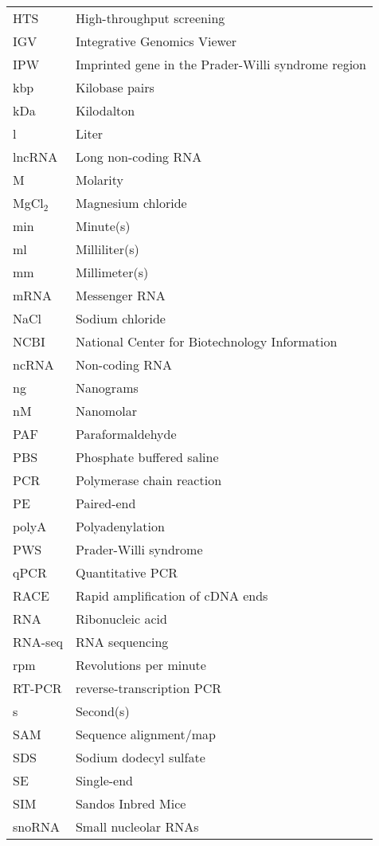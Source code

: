 \begin{longtabu}{ll}
  HTS    & High-throughput screening\\
  IGV    & Integrative Genomics Viewer\\
  IPW    & Imprinted gene in the Prader-Willi syndrome region\\
  kbp    & Kilobase pairs\\
  kDa    & Kilodalton\\
  l      & Liter\\
  lncRNA & Long non-coding RNA\\
  M      & Molarity\\
  MgCl$_2$ & Magnesium chloride\\
  min    & Minute(s)\\
  ml     & Milliliter(s)\\
  mm     & Millimeter(s)\\
  mRNA   & Messenger RNA\\
  NaCl   & Sodium chloride\\
  NCBI   & National Center for Biotechnology Information\\
  ncRNA  & Non-coding RNA\\
  ng     & Nanograms\\
  nM     & Nanomolar\\
  PAF    & Paraformaldehyde\\
  PBS    & Phosphate buffered saline\\
  PCR    & Polymerase chain reaction\\
  PE     & Paired-end\\
  polyA  & Polyadenylation\\
  PWS    & Prader-Willi syndrome\\
  qPCR   & Quantitative PCR\\
  RACE   & Rapid amplification of cDNA ends\\
  RNA    & Ribonucleic acid\\
  RNA-seq & RNA sequencing\\
  rpm    & Revolutions per minute\\
  RT-PCR & reverse-transcription PCR\\
  s      & Second(s)\\
  SAM    & Sequence alignment/map\\
  SDS    & Sodium dodecyl sulfate\\
  SE     & Single-end\\
  SIM    & Sandos Inbred Mice\\
  snoRNA & Small nucleolar RNAs\\

\end{longtabu}
